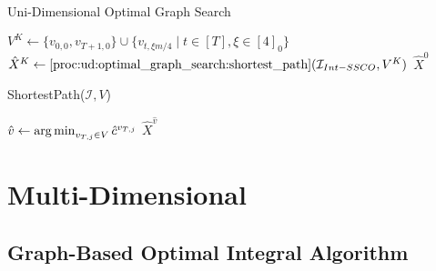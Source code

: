 \begin{algorithm}
    \caption{Uni-Dimensional Optimal Graph Search~\cite{Albers2018}}\label{alg:ud:optimal_graph_search}
    $V^K \gets \{v_{0,0}, v_{T+1,0}\} \cup \{v_{t,\xi m / 4} \mid t \in [T], \xi \in [4]_0\}$\;
    $\hat{X}^K \gets \text{\ref{proc:ud:optimal_graph_search:shortest_path}}(\mathcal{I}_{Int-SSCO}, V^K)$\;
    \Return $\hat{X}^0$\;
\end{algorithm}

\begin{function}
	\caption{ShortestPath($\mathcal{I}, V$)}\label{proc:ud:optimal_graph_search:shortest_path}
    $\hat{v} \gets \operatorname*{arg\,min}_{v_{T,j} \in V} \hat{c}^{v_{T,j}}$\;
	\Return $\hat{X}^{\hat{v}}$\;
\end{function}

\section{Multi-Dimensional}

\subsection{Graph-Based Optimal Integral Algorithm}

